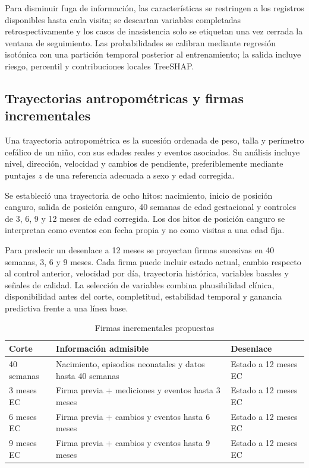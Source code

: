 \documentclass[conference,letterpaper]{IEEEtran}
\begin{document}
Para disminuir fuga de información, las características se restringen a los registros disponibles hasta cada visita; se descartan variables completadas retrospectivamente y los casos de inasistencia solo se etiquetan una vez cerrada la ventana de seguimiento. Las probabilidades se calibran mediante regresión isotónica con una partición temporal posterior al entrenamiento; la salida incluye riesgo, percentil y contribuciones locales TreeSHAP.

\subsection{Trayectorias antropométricas y firmas incrementales}

Una trayectoria antropométrica es la sucesión ordenada de peso, talla y perímetro cefálico de un niño, con sus edades reales y eventos asociados. Su análisis incluye nivel, dirección, velocidad y cambios de pendiente, preferiblemente mediante puntajes $z$ de una referencia adecuada a sexo y edad corregida.

Se estableció una trayectoria de ocho hitos: nacimiento, inicio de posición canguro, salida de posición canguro, 40 semanas de edad gestacional y controles de 3, 6, 9 y 12 meses de edad corregida. Los dos hitos de posición canguro se interpretan como eventos con fecha propia y no como visitas a una edad fija.

Para predecir un desenlace a 12 meses se proyectan firmas sucesivas en 40 semanas, 3, 6 y 9 meses. Cada firma puede incluir estado actual, cambio respecto al control anterior, velocidad por día, trayectoria histórica, variables basales y señales de calidad. La selección de variables combina plausibilidad clínica, disponibilidad antes del corte, completitud, estabilidad temporal y ganancia predictiva frente a una línea base.

\begin{table}[!t]
\caption{Firmas incrementales propuestas}
\centering
\scriptsize
\begin{tabular}{p{} p{} p{}}
\toprule
Corte & Información admisible & Desenlace \\
\midrule
40 semanas & Nacimiento, episodios neonatales y datos hasta 40 semanas & Estado a 12 meses EC \\
3 meses EC & Firma previa + mediciones y eventos hasta 3 meses & Estado a 12 meses EC \\
6 meses EC & Firma previa + cambios y eventos hasta 6 meses & Estado a 12 meses EC \\
9 meses EC & Firma previa + cambios y eventos hasta 9 meses & Estado a 12 meses EC \\
\bottomrule
\end{tabular}
\end{table}
\end{document}
